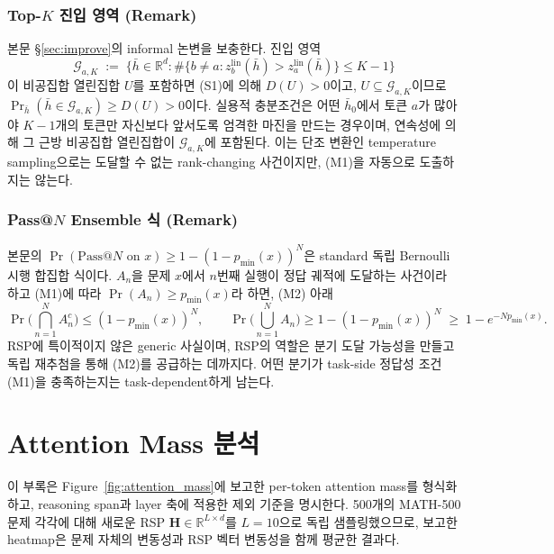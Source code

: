 \subsubsection{Top-$K$ 진입 영역 (Remark)}\label{app:topk_entry}

본문 \S\ref{sec:improve}의 informal 논변을 보충한다. 진입 영역
\[
\mathcal{G}_{a,K}
\;:=\;
\bigl\{\bar h \in \mathbb{R}^d : \#\{b\neq a : z_b^{\mathrm{lin}}(\bar h) > z_a^{\mathrm{lin}}(\bar h)\} \le K-1\bigr\}
\]
이 비공집합 열린집합 $U$를 포함하면 (S1)에 의해 $D(U)>0$이고, $U \subseteq \mathcal{G}_{a,K}$이므로 $\Pr_{\bar h}(\bar h \in \mathcal{G}_{a,K}) \ge D(U) > 0$이다. 실용적 충분조건은 어떤 $\bar h_0$에서 토큰 $a$가 많아야 $K-1$개의 토큰만 자신보다 앞서도록 엄격한 마진을 만드는 경우이며, 연속성에 의해 그 근방 비공집합 열린집합이 $\mathcal{G}_{a,K}$에 포함된다. 이는 단조 변환인 temperature sampling으로는 도달할 수 없는 rank-changing 사건이지만, (M1)을 자동으로 도출하지는 않는다.

\subsubsection{Pass@$N$ Ensemble 식 (Remark)}\label{app:passN_ensemble}

본문의 $\Pr(\mathrm{Pass@}N \text{ on } x) \ge 1-(1-p_{\min}(x))^N$은 standard 독립 Bernoulli 시행 합집합 식이다. $A_n$을 문제 $x$에서 $n$번째 실행이 정답 궤적에 도달하는 사건이라 하고 (M1)에 따라 $\Pr(A_n) \ge p_{\min}(x)$라 하면, (M2) 아래
\[
\Pr\!\Big(\bigcap_{n=1}^N A_n^c\Big)
\le (1-p_{\min}(x))^N,
\qquad
\Pr\!\Big(\bigcup_{n=1}^N A_n\Big)
\ge 1-(1-p_{\min}(x))^N
\;\ge\; 1-e^{-N p_{\min}(x)}.
\]
RSP에 특이적이지 않은 generic 사실이며, RSP의 역할은 분기 도달 가능성을 만들고 독립 재추첨을 통해 (M2)를 공급하는 데까지다. 어떤 분기가 task-side 정답성 조건 (M1)을 충족하는지는 task-dependent하게 남는다.

\clearpage
\section{Attention Mass 분석}\label{app:attention_mass}

이 부록은 Figure~\ref{fig:attention_mass}에 보고한 per-token attention mass를 형식화하고, reasoning span과 layer 축에 적용한 제외 기준을 명시한다. 500개의 MATH-500 문제 각각에 대해 새로운 RSP $\mathbf{H} \in \mathbb{R}^{L \times d}$를 $L = 10$으로 독립 샘플링했으므로, 보고한 heatmap은 문제 자체의 변동성과 RSP 벡터 변동성을 함께 평균한 결과다.

